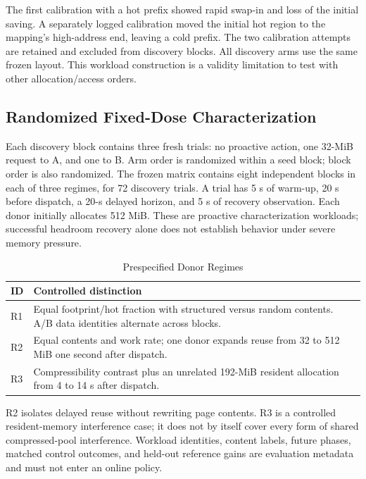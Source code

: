 \documentclass[conference]{IEEEtran}
\begin{document}
The first calibration with a hot prefix showed rapid swap-in and loss of the
initial saving. A separately logged calibration moved the initial hot region to the
mapping's high-address end, leaving a cold prefix. The two calibration attempts
are retained and excluded from discovery blocks. All discovery arms use the
same frozen layout. This workload construction is a validity limitation to test
with other allocation/access orders.

\subsection{Randomized Fixed-Dose Characterization}
Each discovery block contains three fresh trials: no proactive action, one
32-MiB request to A, and one to B. Arm order is randomized within a seed block;
block order is also randomized. The frozen matrix contains eight independent
blocks in each of three regimes, for 72 discovery trials. A trial has 5 s of
warm-up, 20 s before dispatch, a 20-s delayed horizon, and 5 s of recovery
observation. Each donor initially allocates 512 MiB. These are proactive
characterization workloads; successful headroom recovery alone does not
establish behavior under severe memory pressure.

\begin{table}[t]
\caption{Prespecified Donor Regimes}
\label{tab:regimes}
\centering\small
\begin{tabular}{@{}p{}p{}@{}}
\toprule
ID & Controlled distinction \\
\midrule
R1 & Equal footprint/hot fraction with structured versus random contents. A/B data identities alternate across blocks. \\
R2 & Equal contents and work rate; one donor expands reuse from 32 to 512 MiB one second after dispatch. \\
R3 & Compressibility contrast plus an unrelated 192-MiB resident allocation from 4 to 14 s after dispatch. \\
\bottomrule
\end{tabular}
\end{table}

R2 isolates delayed reuse without rewriting page contents. R3 is a controlled
resident-memory interference case; it does not by itself cover every form of
shared compressed-pool interference. Workload identities, content labels,
future phases, matched control outcomes, and held-out reference gains are
evaluation metadata and must not enter an online policy.
\end{document}
